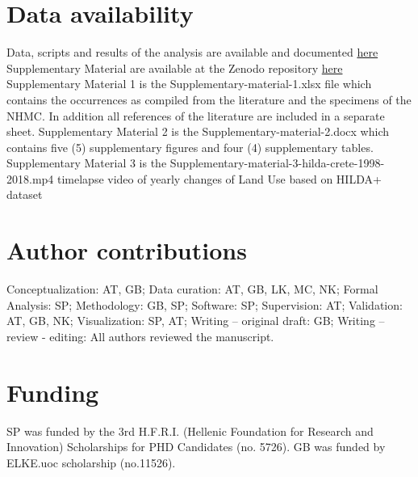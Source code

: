 \section*{Data availability}
Data, scripts and results of the analysis are available and documented \href{https://github.com/savvas-paragkamian/arthropods_assessment_crete}{here}
Supplementary Material are available at the Zenodo repository \href{https://doi.org/10.5281/zenodo.10635645}{here}
Supplementary Material 1 is the Supplementary-material-1.xlsx file which
contains the occurrences as compiled from the literature and the specimens of the
NHMC. In addition all references of the literature are included in a separate sheet.
Supplementary Material 2 is the Supplementary-material-2.docx which
contains five (5) supplementary figures and four (4) supplementary tables.
Supplementary Material 3 is the
Supplementary-material-3-hilda-crete-1998-2018.mp4 timelapse video of yearly
changes of Land Use based on HILDA+ dataset 

\section*{Author contributions}
Conceptualization: AT, GB;
Data curation: AT, GB, LK, MC, NK;
Formal Analysis: SP; Methodology: GB, SP; Software: SP; Supervision: AT;
Validation: AT, GB, NK; Visualization: SP, AT; Writing – original draft: GB;
Writing – review - editing: All authors reviewed the manuscript.

\section*{Funding}

SP was funded by the 3rd H.F.R.I.
(Hellenic Foundation for Research and Innovation) Scholarships for
PHD Candidates (no. 5726). GB was funded by ELKE.uoc scholarship (no.11526).

